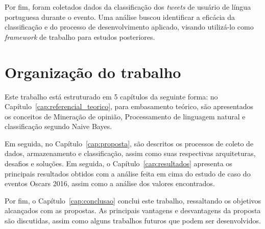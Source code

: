 Por fim, foram coletados dados da classificação dos \textit{tweets} de usuário de língua portuguesa durante o evento. Uma análise buscou identificar a eficácia da classificação e do processo de desenvolvimento aplicado, visando utilizá-lo como \textit{framework} de trabalho para estudos posteriores.


\section{Organização do trabalho}

Este trabalho está estruturado em 5 capítulos da seguinte forma: no Capítulo~\ref{cap:referencial_teorico}, para embasamento teórico, são apresentados os conceitos de Mineração de opinião, Processamento de linguagem natural e classificação segundo Naive Bayes. 

Em seguida, no Capítulo~\ref{cap:proposta}, são descritos os processos de coleto de dados, armazenamento e classificação, assim como suas respectivas arquiteturas, desafios e soluções. Em seguida, o Capítulo~\ref{cap:resultados} apresenta os principais resultados obtidos com a análise feita em cima do estudo de caso do eventos Oscars 2016, assim como a análise dos valores encontrados. 

Por fim, o Capítulo~\ref{cap:conclusao} conclui este trabalho, ressaltando os objetivos alcançados com as propostas. As principais vantagens e desvantagens da proposta são discutidas, assim como alguns trabalhos futuros que podem ser desenvolvidos. 
